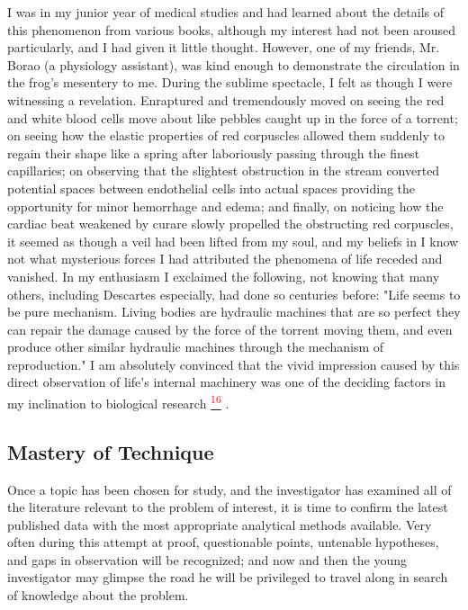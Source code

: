 \documentclass{article}
\newcommand{\noteref}[1]{%
 \hypertarget{ref:#1}{}%
 \hyperlink{note:#1}{\textsuperscript{\textcolor{red}{#1}}}%
}
\begin{document}
I was in my junior year of medical studies and had learned about the details of this phenomenon from various books, although my interest had not been aroused particularly, and I had given it little thought. However, one of my friends, Mr. Borao (a physiology assistant), was kind enough to demonstrate the circulation in the frog’s mesentery to me. During the sublime spectacle, I felt as though I were witnessing a revelation. Enraptured and tremendously moved on seeing the red and white blood cells move about like pebbles caught up in the force of a torrent; on seeing how the elastic properties of red corpuscles allowed them suddenly to regain their shape like a spring after laboriously passing through the finest capillaries; on observing that the slightest obstruction in the stream converted potential spaces between endothelial cells into actual spaces providing the opportunity for minor hemorrhage and edema; and finally, on noticing how the cardiac beat weakened by curare slowly propelled the obstructing red corpuscles, it seemed as though a veil had been lifted from my soul, and my beliefs in I know not what mysterious forces I had attributed the phenomena of life receded and vanished. In my enthusiasm I exclaimed the following, not knowing that many others, including Descartes especially, had done so centuries before: "Life seems to be pure mechanism. Living bodies are hydraulic machines that are so perfect they can repair the damage caused by the force of the torrent moving them, and even produce other similar hydraulic machines through the mechanism of reproduction." I am absolutely convinced that the vivid impression caused by this direct observation of life’s internal machinery was one of the deciding factors in my inclination to biological research\noteref{16}.

\subsection*{Mastery of Technique}

Once a topic has been chosen for study, and the investigator has examined all of the literature relevant to the problem of interest, it is time to confirm the latest published data with the most appropriate analytical methods available. Very often during this attempt at proof, questionable points, untenable hypotheses, and gaps in observation will be recognized; and now and then the young investigator may glimpse the road he will be privileged to travel along in search of knowledge about the problem.
\end{document}
